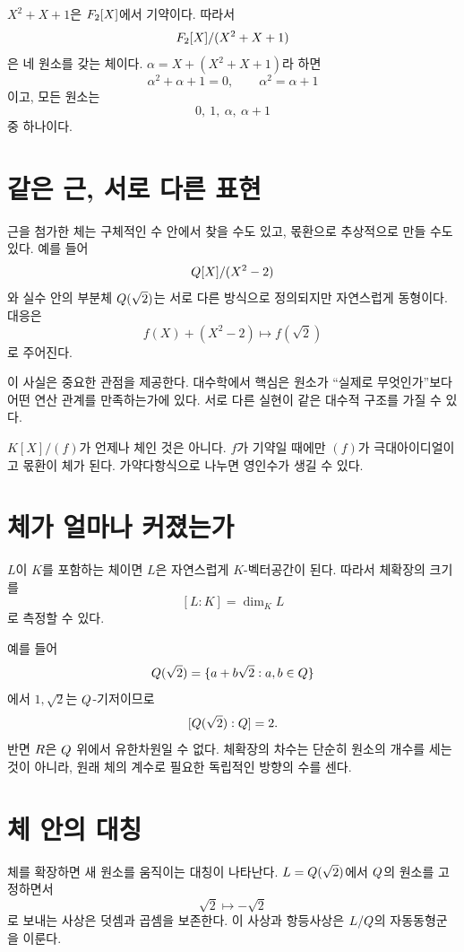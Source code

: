 \begin{example}
$X^2+X+1$은 $F_2[X]$에서 기약이다. 따라서
\[
  F_2[X]/(X^2+X+1)
\]
은 네 원소를 갖는 체이다. $\alpha=X+(X^2+X+1)$라 하면
\[
  \alpha^2+\alpha+1=0,
  \qquad
  \alpha^2=\alpha+1
\]
이고, 모든 원소는
\[
  0,\ 1,\ \alpha,\ \alpha+1
\]
중 하나이다.
\end{example}

\section{같은 근, 서로 다른 표현}

근을 첨가한 체는 구체적인 수 안에서 찾을 수도 있고, 몫환으로 추상적으로 만들 수도 있다. 예를 들어
\[
  Q[X]/(X^2-2)
\]
와 실수 안의 부분체 $Q(\sqrt2)$는 서로 다른 방식으로 정의되지만 자연스럽게 동형이다. 대응은
\[
  f(X)+(X^2-2)\longmapsto f(\sqrt2)
\]
로 주어진다.

이 사실은 중요한 관점을 제공한다. 대수학에서 핵심은 원소가 ``실제로 무엇인가''보다 어떤 연산 관계를 만족하는가에 있다. 서로 다른 실현이 같은 대수적 구조를 가질 수 있다.

\begin{pitfall}
$K[X]/(f)$가 언제나 체인 것은 아니다. $f$가 기약일 때에만 $(f)$가 극대아이디얼이고 몫환이 체가 된다. 가약다항식으로 나누면 영인수가 생길 수 있다.
\end{pitfall}

\section{체가 얼마나 커졌는가}

$L$이 $K$를 포함하는 체이면 $L$은 자연스럽게 $K$-벡터공간이 된다. 따라서 체확장의 크기를
\[
  [L:K]=\dim_K L
\]
로 측정할 수 있다.

예를 들어
\[
  Q(\sqrt2)
  =\{a+b\sqrt2:a,b\in Q\}
\]
에서 $1,\sqrt2$는 $Q$-기저이므로
\[
  [Q(\sqrt2):Q]=2.
\]
반면 $R$은 $Q$ 위에서 유한차원일 수 없다. 체확장의 차수는 단순히 원소의 개수를 세는 것이 아니라, 원래 체의 계수로 필요한 독립적인 방향의 수를 센다.

\section{체 안의 대칭}

체를 확장하면 새 원소를 움직이는 대칭이 나타난다. $L=Q(\sqrt2)$에서 $Q$의 원소를 고정하면서
\[
  \sqrt2\longmapsto-\sqrt2
\]
로 보내는 사상은 덧셈과 곱셈을 보존한다. 이 사상과 항등사상은 $L/Q$의 자동동형군을 이룬다.

